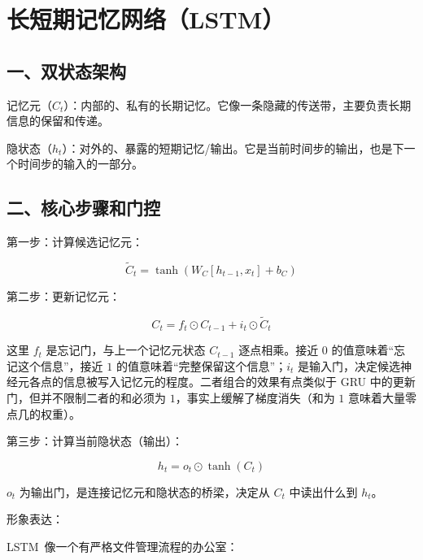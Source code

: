 \setcounter{section}{4}

\hypertarget{ux957fux77edux671fux8bb0ux5fc6ux7f51ux7edclstm}{%
\section{长短期记忆网络（LSTM）}\label{ux957fux77edux671fux8bb0ux5fc6ux7f51ux7edclstm}}

\hypertarget{ux4e00ux53ccux72b6ux6001ux67b6ux6784}{%
\subsection{一、双状态架构}\label{ux4e00ux53ccux72b6ux6001ux67b6ux6784}}

记忆元（\(C_t\)）：内部的、私有的长期记忆。它像一条隐藏的传送带，主要负责长期信息的保留和传递。

隐状态（\(h_t\)）：对外的、暴露的短期记忆/输出。它是当前时间步的输出，也是下一个时间步的输入的一部分。

\hypertarget{ux4e8cux6838ux5fc3ux6b65ux9aa4ux548cux95e8ux63a7}{%
\subsection{二、核心步骤和门控}\label{ux4e8cux6838ux5fc3ux6b65ux9aa4ux548cux95e8ux63a7}}

第一步：计算候选记忆元：

\[
\tilde{C}_t = \tanh(W_C [h_{t-1}, x_t] + b_C)
\]

第二步：更新记忆元：

\[
C_t = f_t \odot C_{t-1} + i_t \odot \tilde{C}_t
\]

这里 \(f_t\) 是忘记门，与上一个记忆元状态 \(C_{t-1}\) 逐点相乘。接近 \(0\) 的值意味着``忘记这个信息''，接近 \(1\) 的值意味着``完整保留这个信息''；\(i_t\) 是输入门，决定候选神经元各点的信息被写入记忆元的程度。二者组合的效果有点类似于 GRU 中的更新门，但并不限制二者的和必须为 \(1\)，事实上缓解了梯度消失（和为 \(1\) 意味着大量零点几的权重）。

第三步：计算当前隐状态（输出）：

\[
h_t = o_t \odot \tanh(C_t)
\]

\(o_t\) 为输出门，是连接记忆元和隐状态的桥梁，决定从 \(C_t\) 中读出什么到 \(h_t\)。

形象表达：

LSTM~像一个有严格文件管理流程的办公室：

